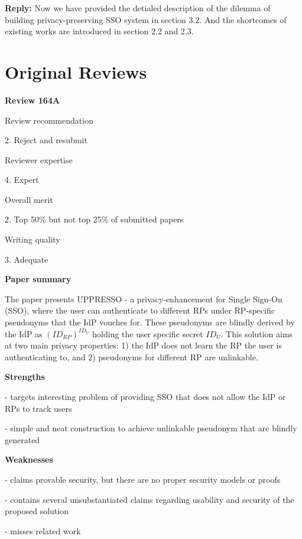 \documentclass[letterpaper,onecolumn,10pt]{article}
\begin{document}
\vspace{1mm}\noindent\textbf{Reply:}
Now we have provided the detialed description of the dilemma of building privacy-preserving SSO system in section 3.2. And the shortcomes of existing works are introduced in section 2.2 and 2.3.


\newpage
\section*{Original Reviews}

\vspace{1mm}\noindent\textbf{Review 164A}


Review recommendation


2. Reject and resubmit

Reviewer expertise


4. Expert

Overall merit


2. Top 50\% but not top 25\% of submitted papers

Writing quality


3. Adequate

\vspace{1mm}\noindent\textbf{Paper summary}


The paper presents UPPRESSO - a privacy-enhancement for Single Sign-On (SSO), where the user can authenticate to different RPs under RP-specific pseudonyms that the IdP vouches for. These pseudonyms are blindly derived by the IdP as $(ID_{RP})^{ID_U}$ holding the user specific secret $ID_U$. This solution aims at two main privacy properties: 1) the IdP does not learn the RP the user is authenticating to, and 2) pseudonyms for different RP are unlinkable.

\vspace{1mm}\noindent\textbf{Strengths}


- targets interesting problem of providing SSO that does not allow the IdP or RPs to track users

- simple and neat construction to achieve unlinkable pseudonym that are blindly generated

\vspace{1mm}\noindent\textbf{Weaknesses}


- claims provable security, but there are no proper security models or proofs

- contains several unsubstantiated claims regarding usability and security of the proposed solution

- misses related work
\end{document}

